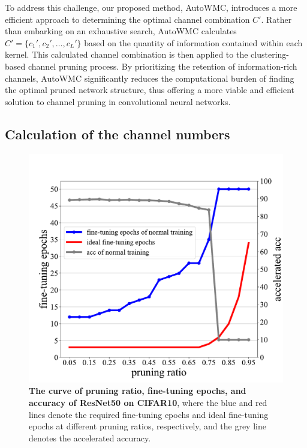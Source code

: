 \documentclass[sigconf, 10pt]{acmart}
\begin{document}
To address this challenge, our proposed method, AutoWMC, introduces a more efficient approach to determining the optimal channel combination \( C' \). Rather than embarking on an exhaustive search, AutoWMC calculates \( C' = \{c_1', c_2', \ldots, c_L'\} \) based on the quantity of information contained within each kernel. This calculated channel combination is then applied to the clustering-based channel pruning process. By prioritizing the retention of information-rich channels, AutoWMC significantly reduces the computational burden of finding the optimal pruned network structure, thus offering a more viable and efficient solution to channel pruning in convolutional neural networks.

\subsection{Calculation of the channel numbers}

\begin{figure}
  \centering
  \includegraphics[width=\linewidth]{Fig4.pdf}
   \caption{\textbf{The curve of pruning ratio, fine-tuning epochs, and accuracy of ResNet50 on CIFAR10}, where the blue and red lines denote the required fine-tuning epochs and ideal fine-tuning epochs at different pruning ratios, respectively, and the grey line denotes the accelerated accuracy.}
   \label{fig:4}
\end{figure}
\end{document}
